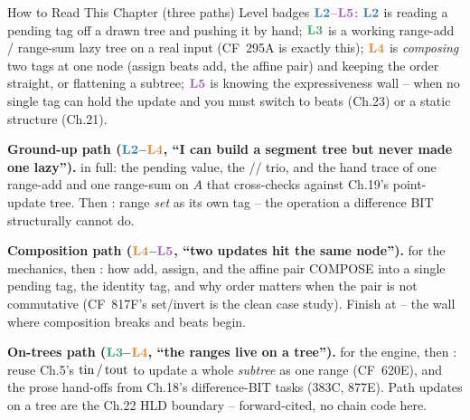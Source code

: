 \begin{chaptertheorybox}{How to Read This Chapter (three paths)}
Level badges \(\lv2\)--\(\lv5\): \(\lv2\) is reading a pending tag off a drawn
tree and pushing it by hand; \(\lv3\) is a working range-add / range-sum lazy
tree on a real input (CF~295A is exactly this); \(\lv4\) is \emph{composing}
two tags at one node (assign beats add, the affine pair) and keeping the order
straight, or flattening a subtree; \(\lv5\) is knowing the expressiveness wall --
when no single tag can hold the update and you must switch to beats (Ch.23) or a
static structure (Ch.21).

\textbf{Ground-up path (\(\lv2\)--\(\lv4\), ``I can build a segment tree but
never made one lazy'').}  in full: the pending value, the
// trio, and the hand trace of one range-add
and one range-sum on \(A\) that cross-checks against Ch.19's point-update tree.
Then : range \emph{set} as its own tag -- the operation a
difference BIT structurally cannot do.

\textbf{Composition path (\(\lv4\)--\(\lv5\), ``two updates hit the same
node'').}  for the mechanics, then : how
add, assign, and the affine pair COMPOSE into a single pending tag, the identity
tag, and why order matters when the pair is not commutative (CF~817F's
set/invert is the clean case study).  Finish at  -- the wall
where composition breaks and beats begin.

\textbf{On-trees path (\(\lv3\)--\(\lv4\), ``the ranges live on a tree'').}
 for the engine, then : reuse Ch.5's
\(\operatorname{tin}/\operatorname{tout}\) to update a whole \emph{subtree} as one range (CF~620E), and the
prose hand-offs from Ch.18's difference-BIT tasks (383C, 877E).  Path updates on
a tree are the Ch.22 HLD boundary -- forward-cited, no chain code here.
\end{chaptertheorybox}

